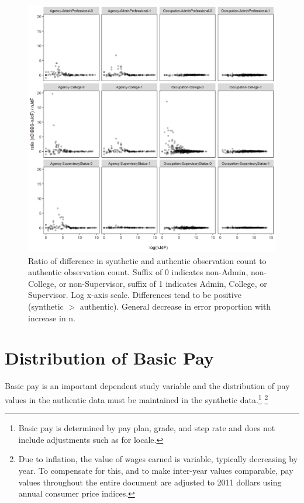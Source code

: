 \documentclass[10pt, letterpaper]{article}
\begin{document}
\begin{spacing}{1.0}
\clearpage

\begin{figure}[]
    \centering
    \includegraphics[width=6in]{nRatioGrade.png}
    \caption{Ratio of difference in synthetic and authentic observation count to authentic observation count.  Suffix of 0 indicates non-Admin, non-College, or non-Supervisor, suffix of 1 indicates Admin, College, or Supervisor.  Log x-axis scale.  Differences tend to be positive (synthetic $>$ authentic).  General decrease in error proportion with increase in n.}
    \label{figure:nRatioGrade}
\end{figure}

\clearpage

\section{Distribution of Basic Pay}

Basic pay is an important dependent study variable and the distribution of pay values in the authentic data must be maintained in the synthetic data.\footnote{Basic pay is determined by pay plan, grade, and step rate and does not include adjustments such as for locale.} \footnote{Due to inflation, the value of wages earned is variable, typically decreasing by year.  To compensate for this, and to make inter-year values comparable, pay values throughout the entire document are adjusted to 2011 dollars using annual consumer price indices.}


\end{spacing}
\end{document}
